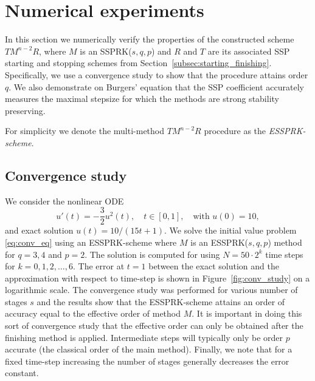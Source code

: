 \section{Numerical experiments}\label{sec:numerics}

In this section we numerically verify the properties of the
constructed scheme $TM^{n-2}R$, where $M$ is an SSPRK($s,q,p$) and
$R$ and $T$ are its associated SSP starting and stopping schemes from
Section~\ref{subsec:starting_finishing}.
Specifically, we use a convergence study to show that the procedure
attains order $q$.  We also demonstrate on Burgers' equation that the
SSP coefficient accurately measures the maximal stepsize for which the
methods are strong stability preserving.

For simplicity we denote the multi-method $TM^{n-2}R$ procedure as the
\emph{ESSPRK-scheme}.

\subsection{Convergence study}\label{subsec:convergence}
We consider the nonlinear ODE
\begin{equation}\label{eq:conv_eq}
    u'(t) = -\frac{3}{2}u^{2}(t), \quad t \in [0,1], \quad \text{with } u(0) = 10,
\end{equation}
and exact solution $u(t) = 10/(15t + 1)$.
We solve the initial value problem \eqref{eq:conv_eq}
using an ESSPRK-scheme where $M$ is an 
ESSPRK($s,q,p$) method for $q = 3, 4$ and $p = 2$.
The solution is computed for using $N = 50 \cdot 2^{k}$ time steps for
$k = 0, 1, 2, \dots, 6$.
The error at $t=1$ between the exact solution and the approximation with respect 
to time-step is shown in Figure~\ref{fig:conv_study} on a logarithmic scale.
The convergence study was performed for various number of stages $s$ and the results 
show that the ESSPRK-scheme attains an order of accuracy equal to the effective order of 
method $M$.
It is important in doing this sort of convergence study that the
effective order can only be obtained after the finishing method is
applied.
Intermediate steps will typically only be order $p$ accurate (the classical
order of the main method).
Finally, we note that for a fixed time-step increasing the number of stages
generally decreases the error constant.

